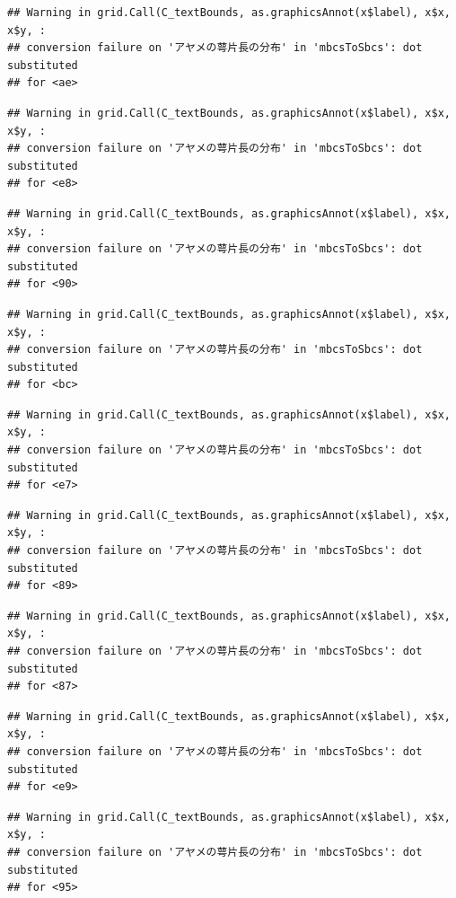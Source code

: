 \documentclass[
]{book}
\begin{document}
\begin{verbatim}
## Warning in grid.Call(C_textBounds, as.graphicsAnnot(x$label), x$x, x$y, :
## conversion failure on 'アヤメの萼片長の分布' in 'mbcsToSbcs': dot substituted
## for <ae>
\end{verbatim}

\begin{verbatim}
## Warning in grid.Call(C_textBounds, as.graphicsAnnot(x$label), x$x, x$y, :
## conversion failure on 'アヤメの萼片長の分布' in 'mbcsToSbcs': dot substituted
## for <e8>
\end{verbatim}

\begin{verbatim}
## Warning in grid.Call(C_textBounds, as.graphicsAnnot(x$label), x$x, x$y, :
## conversion failure on 'アヤメの萼片長の分布' in 'mbcsToSbcs': dot substituted
## for <90>
\end{verbatim}

\begin{verbatim}
## Warning in grid.Call(C_textBounds, as.graphicsAnnot(x$label), x$x, x$y, :
## conversion failure on 'アヤメの萼片長の分布' in 'mbcsToSbcs': dot substituted
## for <bc>
\end{verbatim}

\begin{verbatim}
## Warning in grid.Call(C_textBounds, as.graphicsAnnot(x$label), x$x, x$y, :
## conversion failure on 'アヤメの萼片長の分布' in 'mbcsToSbcs': dot substituted
## for <e7>
\end{verbatim}

\begin{verbatim}
## Warning in grid.Call(C_textBounds, as.graphicsAnnot(x$label), x$x, x$y, :
## conversion failure on 'アヤメの萼片長の分布' in 'mbcsToSbcs': dot substituted
## for <89>
\end{verbatim}

\begin{verbatim}
## Warning in grid.Call(C_textBounds, as.graphicsAnnot(x$label), x$x, x$y, :
## conversion failure on 'アヤメの萼片長の分布' in 'mbcsToSbcs': dot substituted
## for <87>
\end{verbatim}

\begin{verbatim}
## Warning in grid.Call(C_textBounds, as.graphicsAnnot(x$label), x$x, x$y, :
## conversion failure on 'アヤメの萼片長の分布' in 'mbcsToSbcs': dot substituted
## for <e9>
\end{verbatim}

\begin{verbatim}
## Warning in grid.Call(C_textBounds, as.graphicsAnnot(x$label), x$x, x$y, :
## conversion failure on 'アヤメの萼片長の分布' in 'mbcsToSbcs': dot substituted
## for <95>
\end{verbatim}
\end{document}
